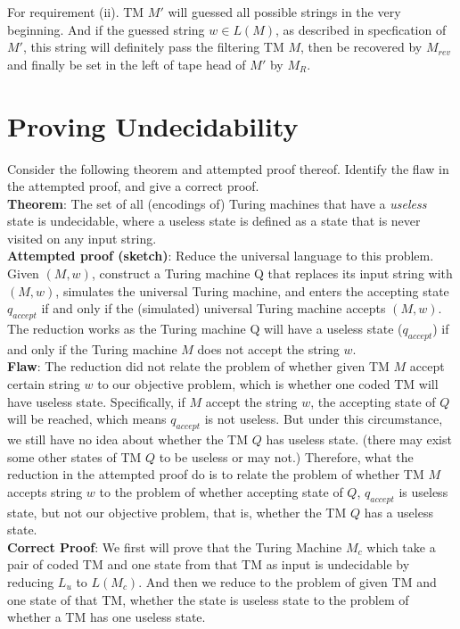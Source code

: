 \documentclass[11pt,a4paper]{article}
\newcommand{\htab}{\hspace*{0.63cm}}
\newcommand{\pg}{\\[0.3cm]}
\newcommand{\lu}{L_{u}}
\begin{document}
\htab For requirement (ii). TM $M'$ will guessed all possible strings in the very beginning. And if the guessed 
string $w \in L(M)$, as described in specfication of $M'$, this string will definitely pass the filtering TM $M$, 
then be recovered by $M_{rev}$ and finally be set in the left of tape head of $M'$ by $M_{R}$. \\
\newpage
\section{Proving Undecidability}
Consider the following theorem and attempted proof thereof. Identify the flaw in the attempted proof, and give a correct proof. \\
\textbf{Theorem}: The set of all (encodings of) Turing machines that have a \textit{useless} state 
is undecidable, where a useless state is defined as a state that is never visited on any input string. \\
\textbf{Attempted proof (sketch)}: Reduce the universal language to this problem. Given $(M, w)$,
construct a Turing machine Q that replaces its input string with $(M, w)$, simulates the universal
Turing machine, and enters the accepting state $q_{accept}$ if and only if the (simulated) universal
Turing machine accepts $(M, w)$. The reduction works as the Turing machine Q will have a useless
state ($q_{accept}$) if and only if the Turing machine $M$ does not accept the string $w$. \pg
\textbf{Flaw}: The reduction did not relate the problem of whether given TM $M$ accept certain 
string $w$ to our objective problem, which is whether one coded TM will have useless state. Specifically,
if $M$ accept the string $w$, the accepting state of $Q$ will be reached, which means $q_{accept}$ is not
 useless. But under this circumstance, we still have no idea about whether the TM $Q$ has useless state.
 (there may exist some other states of TM $Q$ to be useless or may not.) Therefore, what 
 the reduction in the attempted proof do is to relate the problem of whether TM $M$ accepts string
 $w$ to the problem of whether accepting state of $Q$, $q_{accept}$ is useless state, but not our 
 objective problem, that is, whether the TM $Q$ has a useless state. \pg
 \textbf{Correct Proof}: We first will prove that the Turing Machine $M_{c}$ which take 
 a pair of coded TM and one state from that TM as input is undecidable by reducing $\lu$ to 
 $L(M_{c})$. And then we reduce to the problem of given TM and one state of that TM, whether 
 the state is useless state to the problem of whether a TM has one useless state. \\
\end{document}
